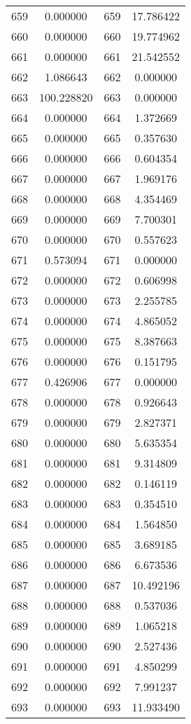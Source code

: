 \documentclass[12pt]{article}
\begin{document}
\begin{longtable}{@{}cccc@{}}
659 & 0.000000 & 659 & 17.786422 \\
660 & 0.000000 & 660 & 19.774962 \\
661 & 0.000000 & 661 & 21.542552 \\
662 & 1.086643 & 662 & 0.000000 \\
663 & 100.228820 & 663 & 0.000000 \\
664 & 0.000000 & 664 & 1.372669 \\
665 & 0.000000 & 665 & 0.357630 \\
666 & 0.000000 & 666 & 0.604354 \\
667 & 0.000000 & 667 & 1.969176 \\
668 & 0.000000 & 668 & 4.354469 \\
669 & 0.000000 & 669 & 7.700301 \\
670 & 0.000000 & 670 & 0.557623 \\
671 & 0.573094 & 671 & 0.000000 \\
672 & 0.000000 & 672 & 0.606998 \\
673 & 0.000000 & 673 & 2.255785 \\
674 & 0.000000 & 674 & 4.865052 \\
675 & 0.000000 & 675 & 8.387663 \\
676 & 0.000000 & 676 & 0.151795 \\
677 & 0.426906 & 677 & 0.000000 \\
678 & 0.000000 & 678 & 0.926643 \\
679 & 0.000000 & 679 & 2.827371 \\
680 & 0.000000 & 680 & 5.635354 \\
681 & 0.000000 & 681 & 9.314809 \\
682 & 0.000000 & 682 & 0.146119 \\
683 & 0.000000 & 683 & 0.354510 \\
684 & 0.000000 & 684 & 1.564850 \\
685 & 0.000000 & 685 & 3.689185 \\
686 & 0.000000 & 686 & 6.673536 \\
687 & 0.000000 & 687 & 10.492196 \\
688 & 0.000000 & 688 & 0.537036 \\
689 & 0.000000 & 689 & 1.065218 \\
690 & 0.000000 & 690 & 2.527436 \\
691 & 0.000000 & 691 & 4.850299 \\
692 & 0.000000 & 692 & 7.991237 \\
693 & 0.000000 & 693 & 11.933490 \\

\end{longtable}
\end{document}
